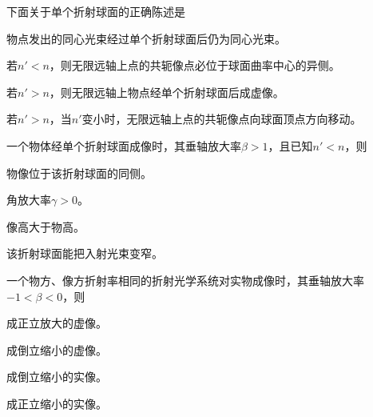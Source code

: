 \documentclass[padl, analysis, notocnum]{ExBook}
\newcommand{\answerarea}[1][3.5cm]{%
  \par\vspace{1mm}%
  \noindent{\color{themeColor!35}\rule{\linewidth}{0.4pt}}\par
  \noindent\begin{minipage}[t][#1][t]{\linewidth}\vspace{0pt}\end{minipage}\par
  \noindent{\color{themeColor!35}\rule{\linewidth}{0.4pt}}\par
}
\begin{document}
\begin{qitems}[startnum=3]
\qitem 下面关于单个折射球面的正确陈述是
\par\noindent\hspace{2em}物点发出的同心光束经过单个折射球面后仍为同心光束。
\par\noindent\hspace{2em}若$n'<n$，则无限远轴上点的共轭像点必位于球面曲率中心的异侧。
\par\noindent\hspace{2em}若$n'>n$，则无限远轴上物点经单个折射球面后成虚像。
\par\noindent\hspace{2em}若$n'>n$，当$n'$变小时，无限远轴上点的共轭像点向球面顶点方向移动。
\label{q:3:start}
\answerarea[4.0cm]
\label{q:3:end}
\end{qitems}

\begin{qitems}[startnum=4]
\qitem 一个物体经单个折射球面成像时，其垂轴放大率$\beta >1$，且已知$n'<n$，则
\par\noindent\hspace{2em}物像位于该折射球面的同侧。
\par\noindent\hspace{2em}角放大率$\gamma >0$。
\par\noindent\hspace{2em}像高大于物高。
\par\noindent\hspace{2em}该折射球面能把入射光束变窄。
\label{q:4:start}
\answerarea[4.0cm]
\label{q:4:end}
\end{qitems}

\begin{qitems}[startnum=5]
\qitem 一个物方、像方折射率相同的折射光学系统对实物成像时，其垂轴放大率$-1<\beta <0$，则
\par\noindent\hspace{2em}成正立放大的虚像。
\par\noindent\hspace{2em}成倒立缩小的虚像。
\par\noindent\hspace{2em}成倒立缩小的实像。
\par\noindent\hspace{2em}成正立缩小的实像。
\label{q:5:start}
\answerarea[4.0cm]
\label{q:5:end}
\end{qitems}
\end{document}
